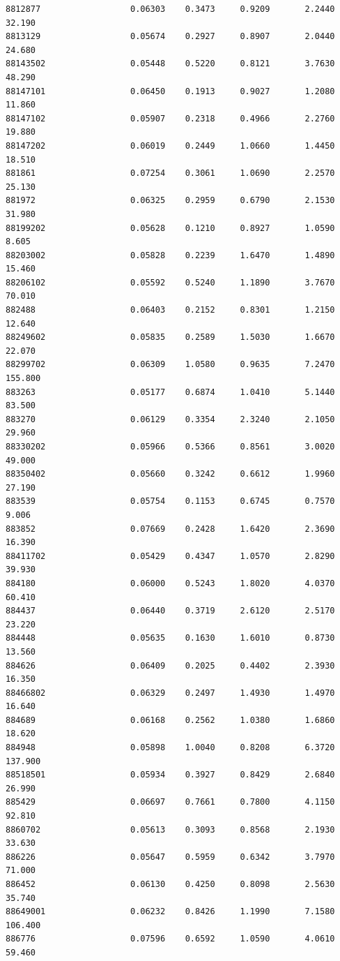 \documentclass[
  letterpaper,
  DIV=11,
  numbers=noendperiod]{scrartcl}
\begin{document}
\begin{verbatim}
8812877                  0.06303    0.3473     0.9209       2.2440  32.190
8813129                  0.05674    0.2927     0.8907       2.0440  24.680
88143502                 0.05448    0.5220     0.8121       3.7630  48.290
88147101                 0.06450    0.1913     0.9027       1.2080  11.860
88147102                 0.05907    0.2318     0.4966       2.2760  19.880
88147202                 0.06019    0.2449     1.0660       1.4450  18.510
881861                   0.07254    0.3061     1.0690       2.2570  25.130
881972                   0.06325    0.2959     0.6790       2.1530  31.980
88199202                 0.05628    0.1210     0.8927       1.0590   8.605
88203002                 0.05828    0.2239     1.6470       1.4890  15.460
88206102                 0.05592    0.5240     1.1890       3.7670  70.010
882488                   0.06403    0.2152     0.8301       1.2150  12.640
88249602                 0.05835    0.2589     1.5030       1.6670  22.070
88299702                 0.06309    1.0580     0.9635       7.2470 155.800
883263                   0.05177    0.6874     1.0410       5.1440  83.500
883270                   0.06129    0.3354     2.3240       2.1050  29.960
88330202                 0.05966    0.5366     0.8561       3.0020  49.000
88350402                 0.05660    0.3242     0.6612       1.9960  27.190
883539                   0.05754    0.1153     0.6745       0.7570   9.006
883852                   0.07669    0.2428     1.6420       2.3690  16.390
88411702                 0.05429    0.4347     1.0570       2.8290  39.930
884180                   0.06000    0.5243     1.8020       4.0370  60.410
884437                   0.06440    0.3719     2.6120       2.5170  23.220
884448                   0.05635    0.1630     1.6010       0.8730  13.560
884626                   0.06409    0.2025     0.4402       2.3930  16.350
88466802                 0.06329    0.2497     1.4930       1.4970  16.640
884689                   0.06168    0.2562     1.0380       1.6860  18.620
884948                   0.05898    1.0040     0.8208       6.3720 137.900
88518501                 0.05934    0.3927     0.8429       2.6840  26.990
885429                   0.06697    0.7661     0.7800       4.1150  92.810
8860702                  0.05613    0.3093     0.8568       2.1930  33.630
886226                   0.05647    0.5959     0.6342       3.7970  71.000
886452                   0.06130    0.4250     0.8098       2.5630  35.740
88649001                 0.06232    0.8426     1.1990       7.1580 106.400
886776                   0.07596    0.6592     1.0590       4.0610  59.460

\end{verbatim}
\end{document}
